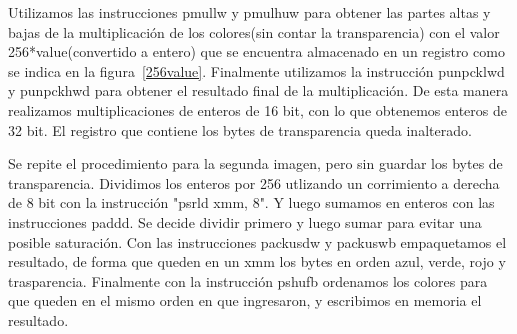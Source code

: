 \documentclass[a4paper]{article}
\begin{document}
Utilizamos las instrucciones pmullw y pmulhuw para obtener las partes altas y bajas de la multiplicación de los colores(sin contar la transparencia) con el valor 256*value(convertido a entero) que se encuentra almacenado en un registro como se indica en la figura~\ref{256value}. Finalmente utilizamos la instrucción punpcklwd y punpckhwd para obtener el resultado final de la multiplicación. De esta manera realizamos multiplicaciones de enteros de 16 bit, con lo que obtenemos enteros de 32 bit. El registro que contiene los bytes de transparencia queda inalterado.

Se repite el procedimiento para la segunda imagen, pero sin guardar los bytes de transparencia. Dividimos los enteros por 256 utlizando un corrimiento a derecha de 8 bit con la instrucción "psrld xmm, 8". Y luego sumamos en enteros con las instrucciones paddd. Se decide dividir primero y luego sumar para evitar una posible saturación. Con las instrucciones packusdw y packuswb empaquetamos el resultado, de forma que queden en un xmm los bytes en orden azul, verde, rojo y trasparencia. Finalmente con la instrucción pshufb ordenamos los colores para que queden en el mismo orden en que ingresaron, y escribimos en memoria el resultado.

\newpage
\end{document}
